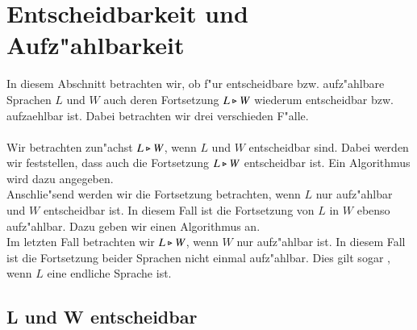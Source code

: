 \section{Entscheidbarkeit und Aufz"ahlbarkeit}
In diesem Abschnitt betrachten wir, ob f"ur entscheidbare bzw. aufz"ahlbare Sprachen $L$ und $W$ auch deren Fortsetzung $L\triangleright W$ wiederum entscheidbar bzw. aufzaehlbar ist. Dabei betrachten wir drei verschieden F"alle.\\\\
Wir betrachten zun"achst $L\triangleright W$, wenn $L$ und $W$ entscheidbar sind. Dabei werden wir feststellen, dass auch die Fortsetzung $L\triangleright W$ entscheidbar ist. Ein Algorithmus wird dazu angegeben.\\
Anschlie"send werden wir die Fortsetzung betrachten, wenn $L$ nur aufz"ahlbar und $W$ entscheidbar ist. In diesem Fall ist die Fortsetzung von $L$ in $W$ ebenso aufz"ahlbar. Dazu geben wir einen Algorithmus an.\\
Im letzten Fall betrachten wir $L\triangleright W$, wenn $W$ nur aufz"ahlbar ist. In diesem Fall ist die Fortsetzung beider Sprachen nicht einmal aufz"ahlbar. Dies gilt sogar , wenn $L$ eine endliche Sprache ist.
\subsection{L und W entscheidbar}

